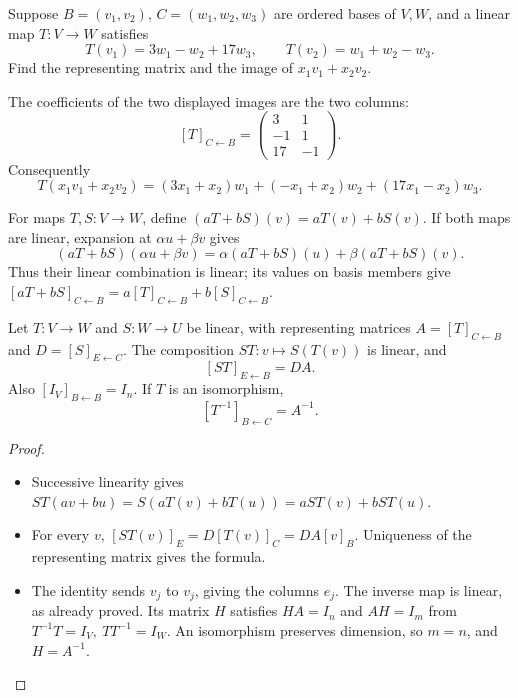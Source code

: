 \begin{example}\label{example:04:representation}
Suppose \(B=(v_1,v_2)\), \(C=(w_1,w_2,w_3)\) are ordered bases
of \(V,W\), and a linear map \(T:V\to W\) satisfies
\[
T(v_1)=3w_1-w_2+17w_3,\qquad T(v_2)=w_1+w_2-w_3.
\]
Find the representing matrix and the image of \(x_1v_1+x_2v_2\).
\par\smallskip
{}
The coefficients of the two displayed images are the two columns:
\[
[T]_{C\leftarrow B}=
\begin{pmatrix}3&1\\-1&1\\17&-1\end{pmatrix}.
\]
Consequently
\[
T(x_1v_1+x_2v_2)
=(3x_1+x_2)w_1+(-x_1+x_2)w_2+(17x_1-x_2)w_3.
\]
\end{example}

For maps \(T,S:V\to W\), define
\((aT+bS)(v)=aT(v)+bS(v)\). If both maps are linear, expansion at
\(\alpha u+\beta v\) gives
\[
(aT+bS)(\alpha u+\beta v)
=\alpha(aT+bS)(u)+\beta(aT+bS)(v).
\]
Thus their linear combination is linear; its values on basis members give
\([aT+bS]_{C\leftarrow B}=a[T]_{C\leftarrow B}+b[S]_{C\leftarrow B}\).

\begin{proposition}\label{prop:04:composition}
Let \(T:V\to W\) and \(S:W\to U\) be linear, with representing matrices
\(A=[T]_{C\leftarrow B}\) and \(D=[S]_{E\leftarrow C}\).
The composition \(ST:v\mapsto S(T(v))\) is linear, and
\[
[ST]_{E\leftarrow B}=DA.
\]
Also \([I_V]_{B\leftarrow B}=I_n\). If \(T\) is an isomorphism,
\[
[T^{-1}]_{B\leftarrow C}=A^{-1}.
\]
\end{proposition}
\begin{proof}
\begin{itemize}
\item Successive linearity gives
  \(ST(av+bu)=S(aT(v)+bT(u))=aST(v)+bST(u)\).
\item For every \(v\),
  \([ST(v)]_E=D[T(v)]_C=DA[v]_B\).
  Uniqueness of the representing matrix gives the formula.
\item The identity sends \(v_j\) to \(v_j\), giving the columns \(e_j\).
  The inverse map is linear, as already proved.
  Its matrix \(H\) satisfies \(HA=I_n\) and \(AH=I_m\) from
  \(T^{-1}T=I_V,\ TT^{-1}=I_W\).
  An isomorphism preserves dimension, so \(m=n\), and \(H=A^{-1}\).
\end{itemize}
\end{proof}

